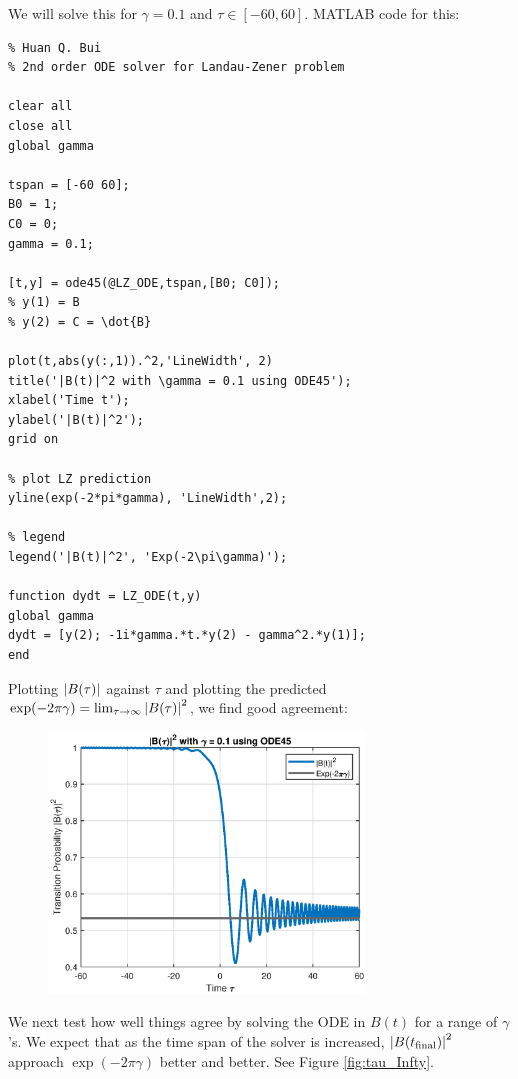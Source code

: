 \documentclass{article}
\theoremstyle{definition}
\begin{document}
We will solve this for $\gamma = 0.1$ and $\tau \in [-60, 60]$. MATLAB code for this: 
\begin{lstlisting}
% Huan Q. Bui
% 2nd order ODE solver for Landau-Zener problem

clear all
close all
global gamma

tspan = [-60 60];
B0 = 1;
C0 = 0;
gamma = 0.1;

[t,y] = ode45(@LZ_ODE,tspan,[B0; C0]);
% y(1) = B
% y(2) = C = \dot{B}

plot(t,abs(y(:,1)).^2,'LineWidth', 2)
title('|B(t)|^2 with \gamma = 0.1 using ODE45');
xlabel('Time t');
ylabel('|B(t)|^2');
grid on

% plot LZ prediction
yline(exp(-2*pi*gamma), 'LineWidth',2);

% legend
legend('|B(t)|^2', 'Exp(-2\pi\gamma)');

function dydt = LZ_ODE(t,y)
global gamma
dydt = [y(2); -1i*gamma.*t.*y(2) - gamma^2.*y(1)];
end

\end{lstlisting}



Plotting $\abs{B(\tau)}$ against $\tau$ and plotting the predicted $\exp(-2\pi \gamma) = \lim_{\tau\to\infty}\abs{B(\tau)}^2$, we find good agreement:
\begin{figure}[!htb]
	\centering
	\includegraphics[width=0.75\textwidth]{LZ}
\end{figure}


We next test how well things agree by solving the ODE in $B(t)$ for a range of $\gamma$'s. We expect that as the time span of the solver is increased, $\abs{B(t_{\text{final}})}^2$ approach $\exp(-2\pi \gamma)$ better and better. See Figure \ref{fig:tau_Infty}.
\end{document}
